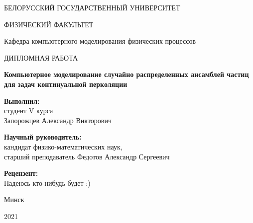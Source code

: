\begin{titlepage}
\begin{center}
БЕЛОРУССКИЙ ГОСУДАРСТВЕННЫЙ УНИВЕРСИТЕТ

ФИЗИЧЕСКИЙ ФАКУЛЬТЕТ

Кафедра компьютерного моделирования физических процессов
\end{center}

\vspace{5cm}

\begin{center}
\LARGE {ДИПЛОМНАЯ РАБОТА}
\end{center}

\begin{center}
\LARGE \bf{Компьютерное моделирование случайно распределенных ансамблей частиц для задач континуальной перколяции}
\end{center}

\vspace{2cm}

\large
\begin{flushright}
\textbf{Выполнил:}\\
студент V курса \\
Запорожцев Александр Викторович\\

\vspace{0.5cm}

\textbf{Научный руководитель:}\\
кандидат физико-математических наук, \\
старший преподаватель Федотов Александр Сергеевич
\end{flushright}
\vspace{0.5cm}

\begin{flushright}
\textbf{Рецензент:}\\
Надеюсь кто-нибудь будет :) 
\end{flushright}

\vspace{1cm}

\begin{center}
Минск 

2021
\end{center}

\end{titlepage}
